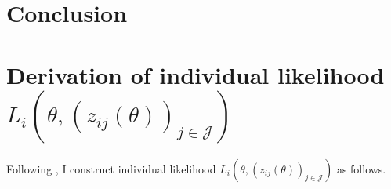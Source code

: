 \documentclass[12pt]{article}
\begin{document}
\section{Conclusion}

\appendix
\section{Derivation of individual likelihood $L_{i}(\theta,(z_{ij}(\theta))_{j\in \mathcal{J}})$}

Following \cite{ursu2023sequential}, I construct individual likelihood $L_{i}(\theta,(z_{ij}(\theta))_{j\in \mathcal{J}})$ as follows.




\end{document}
